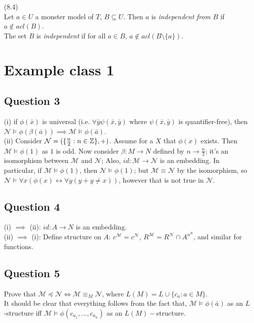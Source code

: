 \documentclass[a4paper]{article}
\begin{document}
\begin{defi} (8.4)\\
    Let $a \in U$ a monster model of $T$, $B \subseteq U$. Then $a$ is \emph{independent from $B$} if $a \not\in acl(B)$.\\
    The set $B$ is \emph{independent} if for all $a \in B$, $a \not\in acl(B\setminus\{a\})$.
\end{defi}






\newpage

\section{Example class 1}

\subsection{Question 3}
(i) if $\phi(\bar{x})$ is universal (i.e. $\forall \bar{y} \psi(\bar{x},\bar{y})$ where $\psi(\bar{x},\bar{y})$ is quantifier-free), then $\mathcal{N} \vDash \phi(\beta(\bar{a})) \implies \mathcal{M} \vDash \phi(\bar{a})$.\\
(ii) Consider $\mathcal{N} = (\{\frac{n}{2} : n \in \mathbb{Z} \},+)$. Assume for a $X$ that $\phi(x)$ exists. Then $\mathcal{M} \vDash \phi(1)$ as $1$ is odd. Now consider $\beta:M \to N$ defined by $n \to \frac{n}{2}$; it's an isomorphism between $\mathcal{M}$ and $\mathcal{N}$; Also, $id:\mathcal{M} \to \mathcal{N}$ is an embedding. In particular, if $\mathcal{M} \vDash \phi(1)$, then $\mathcal{N} \vDash \phi(1)$; but $\mathcal{M} \equiv \mathcal{N}$ by the isomorphism, so $\mathcal{N} \vDash \forall x (\phi(x) \leftrightarrow \forall y (y +y \neq x))$, however that is not true in $\mathcal{N}$.

\subsection{Question 4}
(i) $\implies$ (ii): $id: A \to N$ is an embedding.\\
(ii) $\implies$ (i): Define structure on $A$: $c^{\mathcal{M}} = c^{\mathcal{N}}$, $R^{\mathcal{M}} = R^{\mathcal{N}} \cap A^{n^R}$, and similar for functions.

\subsection{Question 5}
Prove that $\mathcal{M} \preccurlyeq \mathcal{N} \iff \mathcal{M} \equiv_M \mathcal{N}$, where $L(M) = L \cup \{c_a: a \in M\}$.\\
It should be clear that everything follows from the fact that, $\mathcal{M} \vDash \phi(\bar{a})$ as an $L$-structure iff $\mathcal{M} \vDash \phi(c_{a_1},...,c_{a_n})$ as an $L(M)-$structure.
\end{document}
